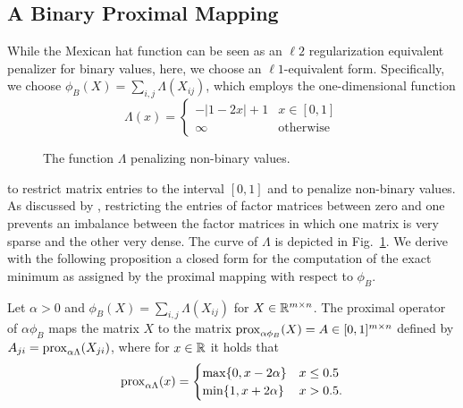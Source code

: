 \subsection{A Binary Proximal Mapping}
While the Mexican hat function can be seen as an $\ell2$ regularization equivalent penalizer for binary values, here, we choose an $\ell1$-equivalent form.
Specifically, we choose $\phi_B(X)=\sum_{i,j}\Lambda(X_{ij})$, which employs the one-dimensional function 
\[
	\Lambda(x) = 
    \begin{cases}
        -|1-2x|+1 &x\in[0,1]\\
        \infty &\text{otherwise}
    \end{cases}
\]
\begin{figure}
\centering

\caption{The function $\Lambda$ penalizing non-binary values.}
\label{fig:lambda}
\end{figure}
to restrict matrix entries to the interval $[0,1]$ and to penalize non-binary values. As discussed by \cite{zhang2010binary}, restricting the entries of factor matrices between zero and one prevents an imbalance between the factor matrices in which one matrix is very sparse and the other very dense. The curve of $\Lambda$ is depicted  in Fig.~\ref{fig:lambda}. 
We derive with the following proposition a closed form for the computation of the exact minimum as assigned by the proximal mapping with respect to $\phi_B$. 
\begin{theorem}
Let $\alpha>0$ and $\phi_B(X)=\sum_{i,j}\Lambda(X_{ij})$ for $X\in\mathbb{R}^{m\times n}$. The proximal operator of $\alpha\phi_B$ maps the matrix $X$ to the matrix $\operatorname{prox}_{\alpha\phi_B}(X)=A\in [0,1]^{m\times n}$ defined by $A_{ji}=\operatorname{prox}_{\alpha\Lambda}(X_{ji})$, where for $x\in \mathbb{R}$ it holds that
    \begin{equation}\label{eq:prox}
	\operatorname{prox}_{\alpha \Lambda}(x)=
    \begin{cases}
        \max\{0,x-2\alpha\} &x\leq0.5\\
        \min\{1,x+2\alpha\} &x>0.5.
    \end{cases}
    \end{equation}
\end{theorem}
